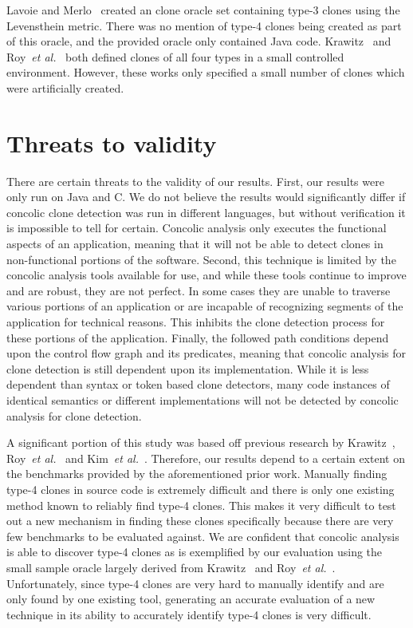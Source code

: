 \documentclass[smallextended]{svjour3}       %
\begin{document}
Lavoie and Merlo~\cite{Lavoie:2011:ATC:1985404.1985411} created an clone oracle set containing type-3 clones using the Levensthein metric. There was no mention of type-4 clones being created as part of this oracle, and the provided oracle only contained Java code. Krawitz~\cite{Kraw2012} and Roy~\emph{et al.}~\cite{Roy:2009:CEC:1530898.1531101} both defined clones of all four types in a small controlled environment. However, these works only specified a small number of clones which were artificially created.

\section{Threats to validity}
\label{sec: threats}


There are certain threats to the validity of our results. First, our results were only run on Java and C. We do not believe the results would significantly differ if concolic clone detection was run in different languages, but without verification it is impossible to tell for certain. Concolic analysis only executes the functional aspects of an application, meaning that it will not be able to detect clones in non-functional portions of the software. Second, this technique is limited by the concolic analysis tools available for use, and while these tools continue to improve and are robust, they are not perfect. In some cases they are unable to traverse various portions of an application or are incapable of recognizing segments of the application for technical reasons. This inhibits the clone detection process for these portions of the application. Finally, the followed path conditions depend upon the control flow graph and its predicates, meaning that concolic analysis for clone detection is still dependent upon its implementation. While it is less dependent than syntax or token based clone detectors, many code instances of identical semantics or different implementations will not be detected by concolic analysis for clone detection.

A significant portion of this study was based off previous research by Krawitz~\cite{Kraw2012}, Roy~\emph{et al.}~\cite{Roy:2009:CEC:1530898.1531101} and Kim~\emph{et al.}~\cite{Kim:2011:MMC:1985793.1985835}. Therefore, our results depend to a certain extent on the benchmarks provided by the aforementioned prior work. Manually finding type-4 clones in source code is extremely difficult and there is only one existing method known to reliably find type-4 clones. This makes it very difficult to test out a new mechanism in finding these clones specifically because there are very few benchmarks to be evaluated against. We are confident that concolic analysis is able to discover type-4 clones as is exemplified by our evaluation using the small sample oracle largely derived from Krawitz~\cite{Kraw2012} and Roy~\emph{et al.}~\cite{Roy:2009:CEC:1530898.1531101}. Unfortunately, since type-4 clones are very hard to manually identify and are only found by one existing tool, generating an accurate evaluation of a new technique in its ability to accurately identify type-4 clones is very difficult.
\end{document}
